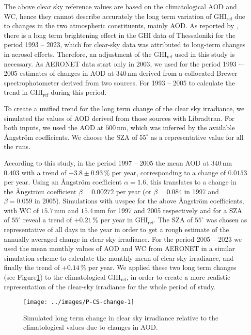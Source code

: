 \documentclass[preprint, 5p,
authoryear]{elsarticle} %
\begin{document}
The above clear sky reference values are based on the climatological AOD
and WC, hence they cannot describe accurately the long term variation of
\(\text{GHI}_\text{ref}\) due to changes in the two atmospheric
constituents, mainly AOD. As reported by \citet{Natsis2023}, there is a
long term brightening effect in the GHI data of Thessaloniki for the
period 1993 -- 2023, which for clear-sky data was attributed to
long-term changes in aerosol effects. Therefore, an adjustment of the
\(\text{GHI}_\text{ref}\) used in this study is necessary. As AERONET
data start only in 2003, we used for the period 1993 -\/-- 2005
estimates of changes in AOD at \(340\,\text{nm}\) derived from a
collocated Brewer spectrophotometer derived from two sources. For 1993
-- 2005 \citep{Kazadzis2007} to calculate the trend in
\(\text{GHI}_\text{ref}\) during this period.

To create a unified trend for the long term change of the clear sky
irradiance, we simulated the values of AOD derived from those sources
with Libradtran. For both inputs, we used the AOD at \(500\,\text{nm}\),
which was inferred by the available Ångström coefficients. We choose the
SZA of \(55^\circ\) as a representative value for all the runs.

According to this study, in the period 1997 -- 2005 the mean AOD at
\(340\,\text{nm}\) \(0.403\) with a trend of \(-3.8\pm0.93\,\%\) per
year, corresponding to a change of \(0.0153\) per year. Using an
Ångström coefficient \(\alpha = 1.6\), this translates to a change in
the Ångström coefficient \(\beta=0.00272\) per year (or \(\beta=0.084\)
in 1997 and \(\beta=0.059\) in 2005). Simulations with uvspec for the
above Ångström coefficients, with WC of \(15.7\,\text{mm}\) and
\(15.4\,\text{mm}\) for 1997 and 2005 respectively and for a SZA of
\(55^\circ\) reveal a trend of \(+0.21\,\%\) per year in
\(\text{GHI}_\text{ref}\). The SZA of \(55^\circ\) was chosen as
representative of all days in the year in order to get a rough estimate
of the annually averaged change in clear sky irradiance. For the period
2005 -- 2023 we used the mean monthly values of AOD and WC from AERONET
in a similar simulation scheme to calculate the monthly mean of clear
sky irradiance, and finally the trend of \(+0.14\,\%\) per year. We
applied these two long term changes (see
Figure\nobreakspace{}\ref{fig:CS-change}) to the climatological
\(\text{GHI}_\text{ref}\), in order to create a more realistic
representation of the clear-sky irradiance for the whole period of
study.

\begin{figure}

{\centering \texttt{[image: ../images/P-CS-change-1]} 

}

\caption{Simulated long term change in clear sky irradiance relative to the climatological values due to changes in AOD.}\label{fig:CS-change}
\end{figure}
\end{document}
